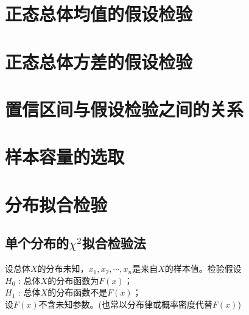 \documentclass[12pt,a4paper]{article}
\begin{document}
\section{正态总体均值的假设检验}



\section{正态总体方差的假设检验}



\section{置信区间与假设检验之间的关系}



\section{样本容量的选取}



\section{分布拟合检验}
\subsection{单个分布的$\chi^2$拟合检验法}
设总体$X$的分布未知，$x_1, x_2, \cdots, x_n$是来自$X$的样本值。检验假设 \\
$H_0$ : 总体$X$的分布函数为$F(x)$；\\
$H_1$ : 总体$X$的分布函数不是$F(x)$；\\
设$F(x)$不含未知参数。(也常以分布律或概率密度代替$F(x)$)
\end{document}
